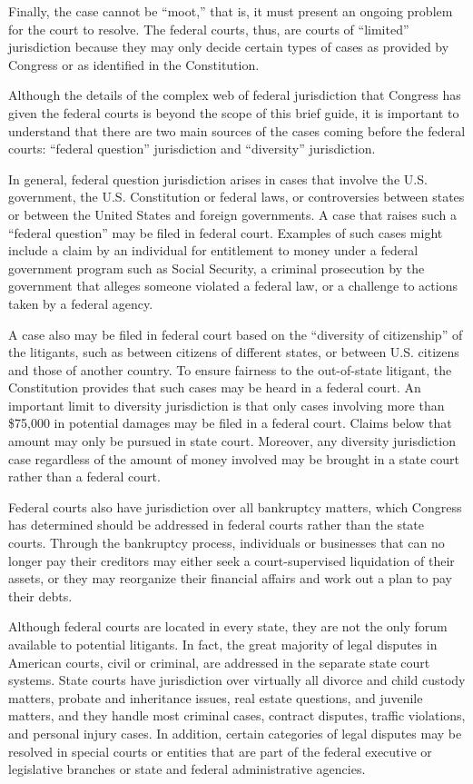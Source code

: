 \documentclass[11pt,letterpaper,twoside]{article}
\begin{document}
Finally, the case cannot be ``moot,'' that is, it must present an
ongoing problem for the court to resolve. The federal courts, thus, are
courts of ``limited'' jurisdiction because they may only decide certain
types of cases as provided by Congress or as identified in the
Constitution.

Although the details of the complex web of federal jurisdiction that
Congress has given the federal courts is beyond the scope of this brief
guide, it is important to understand that there are two main sources of
the cases coming before the federal courts: ``federal question''
jurisdiction and ``diversity'' jurisdiction.

In general, federal question jurisdiction arises in cases that involve
the U.S. government, the U.S. Constitution or federal laws, or
controversies between states or between the United States and foreign
governments. A case that raises such a ``federal question'' may be filed
in federal court. Examples of such cases might include a claim by an
individual for entitlement to money under a federal government program
such as Social Security, a criminal prosecution by the government that
alleges someone violated a federal law, or a challenge to actions taken
by a federal agency.

A case also may be filed in federal court based on the ``diversity of
citizenship'' of the litigants, such as between citizens of different
states, or between U.S. citizens and those of another country. To ensure
fairness to the out-of-state litigant, the Constitution provides that
such cases may be heard in a federal court. An important limit to
diversity jurisdiction is that only cases involving more than \$75,000
in potential damages may be filed in a federal court. Claims below that
amount may only be pursued in state court. Moreover, any diversity
jurisdiction case regardless of the amount of money involved may be
brought in a state court rather than a federal court.

Federal courts also have jurisdiction over all bankruptcy matters, which
Congress has determined should be addressed in federal courts rather
than the state courts. Through the bankruptcy process, individuals or
businesses that can no longer pay their creditors may either seek a
court-supervised liquidation of their assets, or they may reorganize
their financial affairs and work out a plan to pay their debts.

Although federal courts are located in every state, they are not the
only forum available to potential litigants. In fact, the great majority
of legal disputes in American courts, civil or criminal, are addressed
in the separate state court systems. State courts have jurisdiction over
virtually all divorce and child custody matters, probate and inheritance
issues, real estate questions, and juvenile matters, and they handle
most criminal cases, contract disputes, traffic violations, and personal
injury cases. In addition, certain categories of legal disputes may be
resolved in special courts or entities that are part of the federal
executive or legislative branches or state and federal administrative
agencies.
\end{document}
